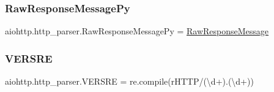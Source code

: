 \subsubsection{\texorpdfstring{Raw\+Response\+Message\+Py}{RawResponseMessagePy}}
{\footnotesize\ttfamily aiohttp.\+http\+\_\+parser.\+Raw\+Response\+Message\+Py = \hyperlink{namespaceaiohttp_1_1http__parser_a9963bd217f7dd3de0c17e121b8b0d4fa}{Raw\+Response\+Message}}

\mbox{\label{namespaceaiohttp_1_1http__parser_a3d426008497c6379763a5e54d57c4e10}} 
\subsubsection{\texorpdfstring{V\+E\+R\+S\+RE}{VERSRE}}
{\footnotesize\ttfamily aiohttp.\+http\+\_\+parser.\+V\+E\+R\+S\+RE = re.\+compile(r\textquotesingle{}H\+T\+TP/(\textbackslash{}d+).(\textbackslash{}d+)\textquotesingle{})}

